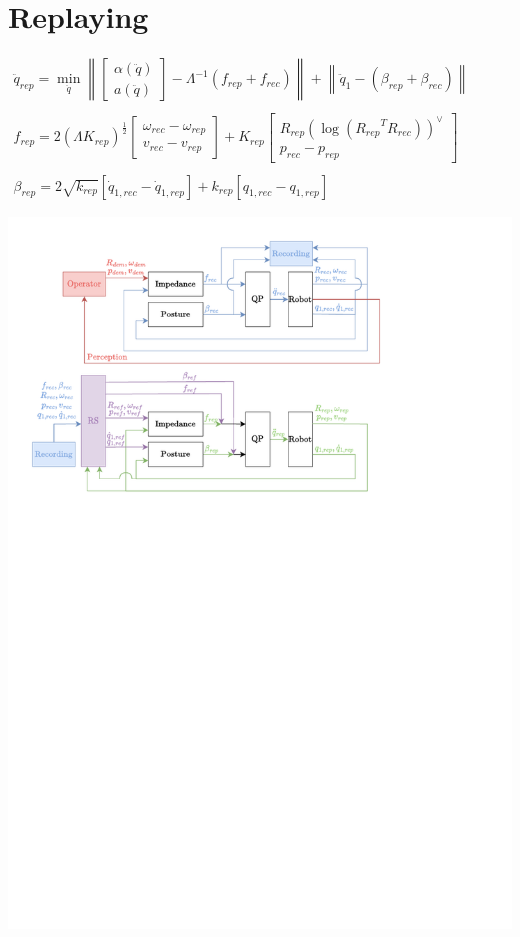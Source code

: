 \documentclass[11pt]{report}
\numberwithin{equation}{section}        %
\numberwithin{figure}{section}          %
\numberwithin{table}{section}           %
\begin{document}
\section*{Replaying}
$\begin{array}{l}
\ddot{q}_{rep} = \min\limits_{\ddot{q}}\left \|  \begin{bmatrix}
\alpha(\ddot{q})\\ 
a(\ddot{q})
\end{bmatrix} - \Lambda^{-1}(f_{rep}+f_{rec}) \right \| + \left \|\ddot{q}_1-(\beta_{rep}+\beta_{rec}) \right \|\\\\
f_{rep} =2(\Lambda K_{rep})^{\frac{1}{2}} \begin{bmatrix}
\omega_{rec} - \omega_{rep}
\\ 
v_{rec}-v_{rep}
\end{bmatrix} + K_{rep} \begin{bmatrix}
R_{rep}(\log({R_{rep}}^TR_{rec}))^{\vee }\\ 
p_{rec}-p_{rep}
\end{bmatrix}\\\\
\beta_{rep} = 2\sqrt{k_{rep}}\left [ \dot{q}_{1,rec}-\dot{q}_{1,rep}  \right ] + k_{rep}\left [ q_{1,rec}-q_{1,rep}  \right ]
\end{array}$

\includegraphics[trim={1cm 17.8cm 5cm 6.5cm}, clip]{Graphics/qp.pdf}
\\
\end{document}
